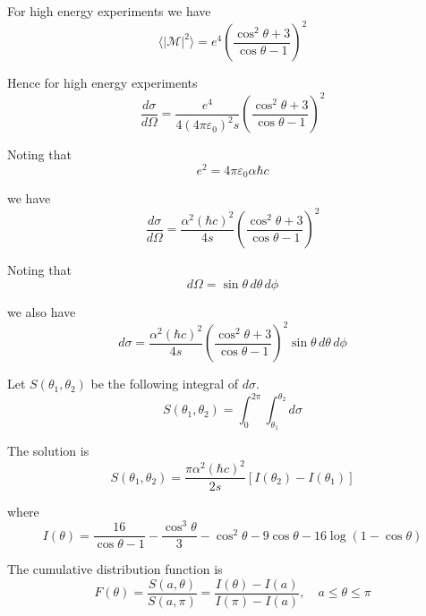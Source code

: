 For high energy experiments we have
\begin{equation*}
\langle|\mathcal{M}|^2\rangle=e^4\left(\frac{\cos^2\theta+3}{\cos\theta-1}\right)^2
\end{equation*}

Hence for high energy experiments
\begin{equation*}
\frac{d\sigma}{d\Omega}=\frac{e^4}{4(4\pi\varepsilon_0)^2s}
\left(\frac{\cos^2\theta+3}{\cos\theta-1}\right)^2
\end{equation*}

Noting that
\begin{equation*}
e^2=4\pi\varepsilon_0\alpha\hbar c
\end{equation*}

we have
\begin{equation*}
\frac{d\sigma}{d\Omega}
=\frac{\alpha^2(\hbar c)^2}{4s}
\left(\frac{\cos^2\theta+3}{\cos\theta-1}\right)^2
\end{equation*}

Noting that
\begin{equation*}
d\Omega=\sin\theta\,d\theta\,d\phi
\end{equation*}

we also have
\begin{equation*}
d\sigma=\frac{\alpha^2(\hbar c)^2}{4s}
\left(\frac{\cos^2\theta+3}{\cos\theta-1}\right)^2
\sin\theta\,d\theta\,d\phi
\end{equation*}

Let $S(\theta_1,\theta_2)$ be the following integral of $d\sigma$.
\begin{equation*}
S(\theta_1,\theta_2)=\int_0^{2\pi}\int_{\theta_1}^{\theta_2}d\sigma
\end{equation*}

The solution is
\begin{equation*}
S(\theta_1,\theta_2)=\frac{\pi\alpha^2(\hbar c)^2}{2s}[I(\theta_2)-I(\theta_1)]
\end{equation*}

where
\begin{equation*}
I(\theta)=\frac{16}{\cos\theta-1}-\frac{\cos^3\theta}{3}-\cos^2\theta-9\cos\theta-16\log(1-\cos\theta)
\end{equation*}

The cumulative distribution function is
\begin{equation*}
F(\theta)
=\frac{S(a,\theta)}{S(a,\pi)}
=\frac{I(\theta)-I(a)}{I(\pi)-I(a)},
\quad
a\le\theta\le\pi
\end{equation*}

